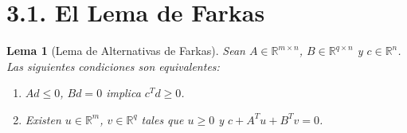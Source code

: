 \documentclass[11pt]{article}
\newtheorem{lema}{Lema}[section]
\begin{document}
\section*{3.1. El Lema de Farkas}

\begin{lema}[Lema de Alternativas de Farkas]
Sean $A\in\mathbb{R}^{m\times n}$, $B\in\mathbb{R}^{q\times n}$ y $c\in\mathbb{R}^n$. Las siguientes condiciones son equivalentes:
\begin{enumerate}
  \item[\textup{(i)}] $Ad\le 0$, $Bd=0$ implica $c^Td\ge 0$.
  \item[\textup{(ii)}] Existen $u\in\mathbb{R}^m$, $v\in\mathbb{R}^q$ tales que $u\ge 0$ y $c+A^Tu+B^Tv=0$.
\end{enumerate}
\end{lema}
\end{document}
